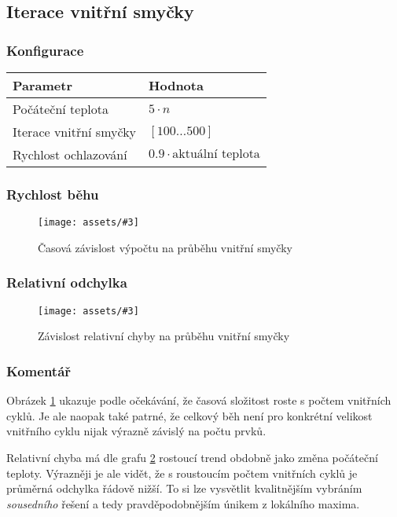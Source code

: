 \documentclass[czech]{article}
\newcommand{\image}[3]{
    \begin{figure}[H]
        \centering
        \texttt{[image: assets/\#3]}
        \caption{#2}
        \label{fig:#1}
    \end{figure}
}
\begin{document}
\subsection{Iterace vnitřní smyčky}

\subsubsection*{Konfigurace}

\begin{tabular}{ | l | l | }
    \hline
    Parametr & Hodnota \\ \hline \hline
    Počáteční teplota & $5 \cdot n$ \\
    Iterace vnitřní smyčky & $[100\dots500]$ \\
    Rychlost ochlazování & $0.9 \cdot \textrm{aktuální teplota}$ \\ \hline
\end{tabular}

\subsubsection*{Rychlost běhu}

\image{dur-inner-loop}{Časová závislost výpočtu na průběhu vnitřní smyčky}{dur-inner-loop.png}

\subsubsection*{Relativní odchylka}

\image{acc-inner-loop}{Závislost relativní chyby na průběhu vnitřní smyčky}{acc-inner-loop.png}

\subsubsection*{Komentář}

Obrázek \ref{fig:dur-inner-loop} ukazuje podle očekávání, že časová složitost roste s počtem vnitřních cyklů.
Je ale naopak také patrné, že celkový běh není pro konkrétní velikost vnitřního cyklu nijak výrazně závislý na počtu prvků.

Relativní chyba má dle grafu \ref{fig:acc-inner-loop} rostoucí trend obdobně jako změna počáteční teploty.
Výrazněji je ale vidět, že s roustoucím počtem vnitřních cyklů je průměrná odchylka řádově nižší.
To si lze vysvětlit kvalitnějším vybráním \textit{sousedního} řešení a tedy pravděpodobnějším únikem z lokálního maxima.
\end{document}
